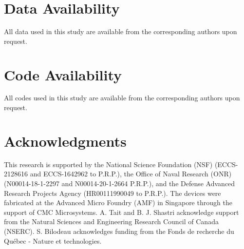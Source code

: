 \documentclass[pdflatex,mathphys]{sty}%
\begin{document}
\section{Data Availability}
All data used in this study are available from the corresponding authors upon request.

\section{Code Availability}
All codes used in this study are available from the corresponding authors upon request.

\backmatter








\section{Acknowledgments}

This research is supported by the National Science Foundation (NSF) (ECCS-2128616 and ECCS-1642962 to P.R.P.), the Office of Naval Research (ONR) (N00014-18-1-2297 and N00014-20-1-2664 P.R.P.), and the Defense Advanced Research Projects Agency (HR00111990049 to P.R.P.). The devices were fabricated at the Advanced Micro Foundry (AMF) in Singapore through the support of CMC Microsystems. A. Tait and B. J. Shastri acknowledge support from the Natural Sciences and Engineering Research Council of Canada (NSERC). S. Bilodeau acknowledges funding from the Fonds de recherche du Québec - Nature et technologies.
\end{document}

